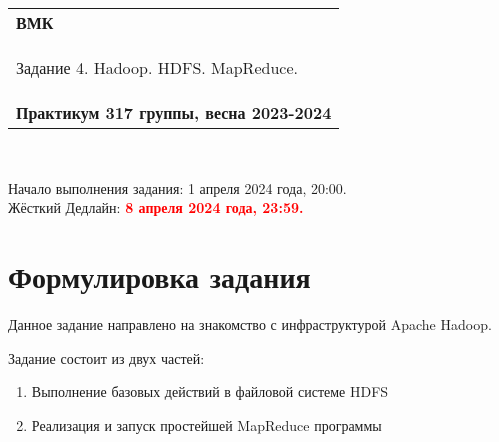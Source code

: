 \documentclass[10pt,fleqn]{article}
\begin{document}
\begin{center}
    \begin{tabular}{|p{17.5cm}|}
        \hline
        \textbf{ВМК}\\
        \begin{center} \Large Задание 4. Hadoop. HDFS. MapReduce. \end{center}\\
        \textbf{Практикум 317 группы, весна 2023-2024}\\
        \hline
    \end{tabular}
\end{center}

\

\begin{tabbing}
    Начало выполнения задания: 1 апреля 2024 года, 20:00.\\
    Жёсткий Дедлайн: \textcolor{red}{\bf 8 апреля 2024 года, 23:59.}
\end{tabbing}


\section*{Формулировка задания}
Данное задание направлено на знакомство с инфраструктурой Apache Hadoop.


Задание состоит из двух частей:
\begin{enumerate}
 \item Выполнение базовых действий в файловой системе HDFS
 \item Реализация и запуск простейшей MapReduce программы
\end{enumerate}
\end{document}
